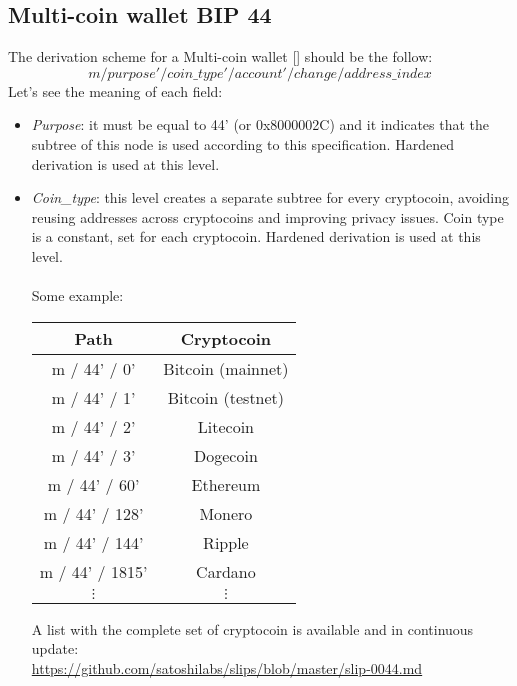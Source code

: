 \subsection{Multi-coin wallet BIP 44}
The derivation scheme for a Multi-coin wallet [\cite{5}] should be the follow:
\begin{equation*}
m / purpose' / coin\_type' / account' / change / address\_index
\end{equation*}
Let's see the meaning of each field:
\begin{itemize}
	\item \textit{Purpose}: it must be equal to 44' (or 0x8000002C)  and it indicates that the subtree of this node is used according to this specification. Hardened derivation is used at this level.
	\item \textit{Coin\_type}: this level creates a separate subtree for every cryptocoin, avoiding reusing addresses across cryptocoins and improving privacy issues. Coin type is a constant, set for each cryptocoin. Hardened derivation is used at this level.
	\\ \\
	Some example:
	\begin{center}
		\begin{tabular}{|| c | c ||} 
			\hline
			Path & Cryptocoin  \\ [0.5ex] 
			\hline\hline
			m / 44' / 0' & Bitcoin (mainnet) \\ 
			m / 44' / 1' & Bitcoin (testnet) \\			
			m / 44' / 2' & Litecoin \\			
			m / 44' / 3' & Dogecoin \\			
			m / 44' / 60' & Ethereum  \\ 
			m / 44' / 128' & Monero  \\
			m / 44' / 144' & Ripple  \\ 
			m / 44' / 1815' & Cardano  \\  
			$\vdots $& $\vdots $  \\ 
			\hline
		\end{tabular}
	\end{center}
	A list with the complete set of cryptocoin is available and in continuous update: \\ \url{https://github.com/satoshilabs/slips/blob/master/slip-0044.md }
	

\end{itemize}
